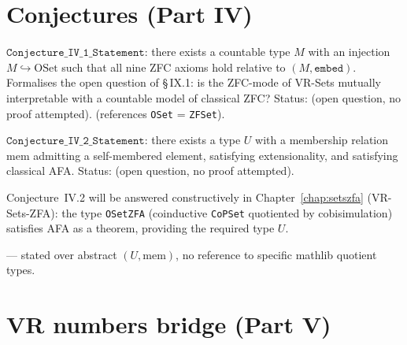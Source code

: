 \section{Conjectures (Part IV)}
\label{sec:sets_conjectures}

\begin{definition}
\label{def:Conjecture_IV_1}
\leanok
{}
$\texttt{Conjecture\_IV\_1\_Statement}$: there exists a countable type
$M$ with an injection $M \hookrightarrow \mathrm{OSet}$ such that all
nine ZFC axioms hold relative to $(M, \texttt{embed})$.
Formalises the open question of §\,IX.1: is the ZFC-mode of VR-Sets
mutually interpretable with a countable model of classical ZFC?
Status: \notready (open question, no proof attempted).
 (references \texttt{OSet} = \texttt{ZFSet}).
\end{definition}

\begin{definition}
\label{def:Conjecture_IV_2}
\leanok
{}
$\texttt{Conjecture\_IV\_2\_Statement}$: there exists a type $U$ with a
membership relation $\mathrm{mem}$ admitting a self-membered element,
satisfying extensionality, and satisfying classical AFA.
Status: \notready (open question, no proof attempted).

\begin{remark}
\label{rem:Conjecture_IV_2_closed}
\leanok
Conjecture~IV.2 will be answered constructively in
Chapter~\ref{chap:setszfa} (VR-Sets-ZFA): the type \texttt{OSetZFA}
(coinductive \texttt{CoPSet} quotiented by cobisimulation) satisfies
AFA as a theorem, providing the required type $U$.
\end{remark}

\noindent\axiomprofile{[]} --- stated over abstract $(U, \mathrm{mem})$,
no reference to specific mathlib quotient types.
\end{definition}

\section{VR numbers bridge (Part V)}
\label{sec:sets_vr_bridge}

